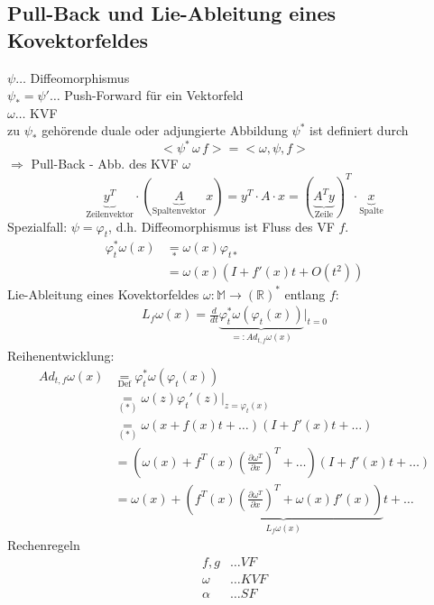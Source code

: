 \documentclass[ngerman]{tudscrreprt}
\begin{document}
\subsection{Pull-Back und Lie-Ableitung eines Kovektorfeldes}
$\psi \dots$ Diffeomorphismus\\ 
$\psi_{*} = \psi' \dots $ Push-Forward für ein Vektorfeld\\ 
$\omega \dots $ KVF \\ 
zu $\psi_{*}$ gehörende duale oder adjungierte Abbildung $\psi^{*}$ ist definiert durch \begin{equation*}< \psi^* \, \omega \, f> = <\omega, \psi, f> \tag{*} \end{equation*} $\Rightarrow$ Pull-Back - Abb. des KVF $\omega$
\begin{equation*}
\underbrace{y^T}_{\text{Zeilenvektor}} \cdot (\underbrace{A}_{\text{Spaltenvektor}}x) = y^T \cdot A\cdot x = (\underbrace{A^T y}_{\text{Zeile}})^T \cdot \underbrace{x}_{\text{Spalte}}
\end{equation*}
Spezialfall: $\psi = \varphi_t$, d.h. Diffeomorphismus ist Fluss des VF $f.$
\begin{align*}
\varphi_t^{*} \omega(x) &\underset{*}{=}  \omega(x) \varphi_{t*}\\ 
&= \omega (x) (I + f'(x)t + O(t^2))
\end{align*}
Lie-Ableitung eines Kovektorfeldes
$\omega : \mathbb{M} \to (\mathbb{R})^* $ entlang $f$: 
\begin{align*}
L_f \omega(x) = \frac{d}{dt}\underbrace{\varphi_t^* \omega (\varphi_t (x))}_{=: Ad_{t,f} \omega(x)}\Big|_{t=0}
\end{align*}
Reihenentwicklung: 
\begin{align*}
Ad_{t,f} \omega(x) &\underset{\text{Def}}{=} \varphi_t^* \omega(\varphi_t (x))\\ 
&\underset{(*)}{=} \omega (z) \varphi_t' (z)\Big|_{z=\varphi_t(x)}\\ 
&\underset{(*)}{=} \omega \left( x + f(x)t + \dots \right) \left( I + f'(x) t + \dots \right)\\ 
&=\left( \omega (x) + f^T (x)\left(\frac{\partial \omega^T}{\partial x}\right)^T + \hdots \right)\left( I + f'(x)t + \hdots \right)\\
&=\omega(x) + \underbrace{\left( f^T (x)\left(\frac{\partial \omega^T}{\partial x}\right)^T + \omega(x)f'(x) \right)}_{L_f \omega(x)}t + \dots
\end{align*}
Rechenregeln 
\begin{align*}
f,g &\dots VF\\ 
\omega &\dots KVF\\ 
\alpha&\dots SF
\end{align*}
\end{document}
